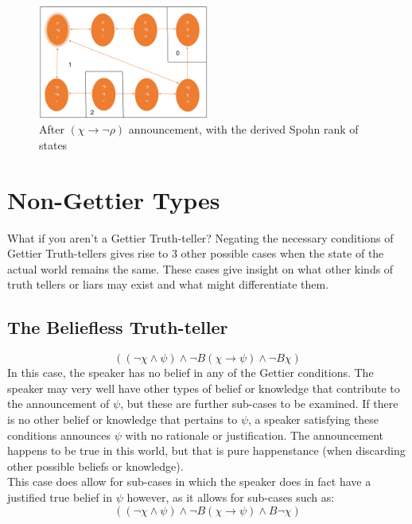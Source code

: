 \documentclass[12pt, titlepage, twoside, a4paper]{report}
\begin{document}
\begin{figure}[h]
  \centering
  \includegraphics[width=0.5\textwidth]{slide21.eps}
  \caption{After $(\chi \to \neg \rho)$ announcement, with the derived Spohn rank of states}
\end{figure}

\chapter{Non-Gettier Types}
What if you aren't a Gettier Truth-teller? Negating the necessary conditions of Gettier Truth-tellers gives rise to 3 other possible cases when the state of the actual world remains the same. These cases give insight on what other kinds of truth tellers or liars may exist and what might differentiate them.

\section{The Beliefless Truth-teller}
$$((\neg \chi \wedge \psi) \wedge \neg B(\chi \to \psi) \wedge \neg B \chi)$$
In this case, the speaker has no belief in any of the Gettier conditions. The speaker may very well have other types of belief or knowledge that contribute to the announcement of $\psi$, but these are further sub-cases to be examined. If there is no other belief or knowledge that pertains to $\psi$, a speaker satisfying these conditions announces $\psi$ with no rationale or justification. The announcement happens to be true in this world, but that is pure happenstance (when discarding other possible beliefs or knowledge).\\
This case does allow for sub-cases in which the speaker does in fact have a justified true belief in $\psi$ however, as it allows for sub-cases such as:
$$((\neg \chi \wedge \psi) \wedge \neg B(\chi \to \psi) \wedge B \neg \chi)$$
\end{document}
